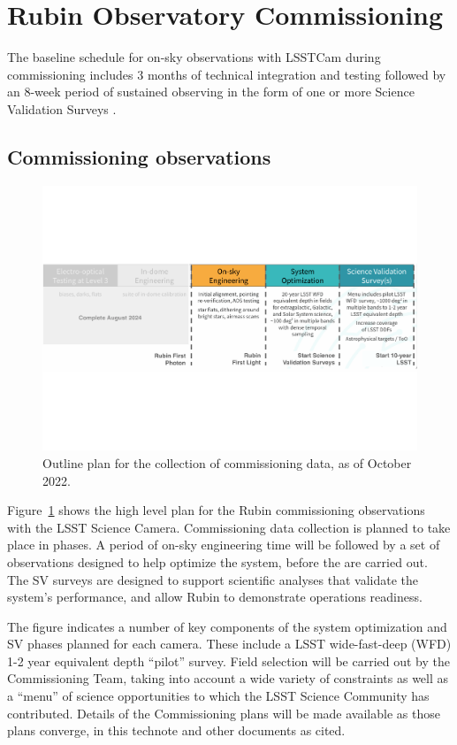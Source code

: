 \section{Rubin Observatory Commissioning}
\label{sec:commissioning}

The baseline schedule for on-sky observations with LSSTCam during commissioning includes 3 months of technical integration and testing followed by an 8-week period of sustained observing in the form of one or more Science Validation Surveys \citep{SCTN-007}.

\subsection{Commissioning observations}

\begin{figure}
\includegraphics[width=\linewidth]{figures/commissioning-plan}
\caption{Outline plan for the collection of commissioning data, as of October 2022.}
\label{fig:commissioning}
\end{figure}

Figure~\ref{fig:commissioning} shows the high level plan for the Rubin commissioning observations with the LSST Science Camera.
Commissioning data collection is planned to take place in phases.
A period of on-sky engineering time will be followed by a set of observations designed to help optimize the system, before the \svs are carried out.
The SV surveys are designed to support scientific analyses that validate the system's performance, and allow Rubin to demonstrate operations readiness.

The figure indicates a number of key components of the system optimization and SV phases planned for each camera.
These include a LSST wide-fast-deep (WFD) 1-2 year equivalent depth ``pilot'' survey.
Field selection will be carried out by the Commissioning Team, taking into account a wide variety of constraints as well as a ``menu'' of science opportunities to which the LSST Science Community has contributed.
Details of the Commissioning plans will be made available as those plans converge, in this technote and other documents as cited.


